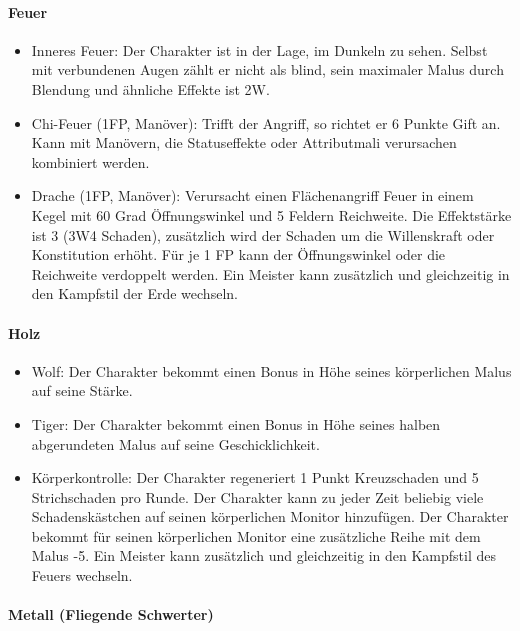 \documentclass{article}
\begin{document}
\paragraph{Feuer}

\begin{itemize}
\item Inneres Feuer: Der Charakter ist in der Lage, im Dunkeln zu sehen. Selbst mit verbundenen Augen zählt er nicht als blind, sein maximaler Malus durch Blendung und ähnliche Effekte ist 2W.
\item Chi-Feuer (1FP, Manöver): Trifft der Angriff, so richtet er 6 Punkte Gift an. Kann mit Manövern, die Statuseffekte oder Attributmali verursachen kombiniert werden.
\item Drache (1FP, Manöver): Verursacht einen Flächenangriff Feuer in einem Kegel mit 60 Grad Öffnungswinkel und 5 Feldern Reichweite. Die Effektstärke ist 3 (3W4 Schaden), zusätzlich wird der Schaden um die Willenskraft oder Konstitution erhöht. Für je 1 FP kann der Öffnungswinkel oder die Reichweite verdoppelt werden. Ein Meister kann zusätzlich und gleichzeitig in den Kampfstil der Erde wechseln.
\end{itemize}

\paragraph{Holz}

\begin{itemize}
\item Wolf: Der Charakter bekommt einen Bonus in Höhe seines körperlichen Malus auf seine Stärke.
\item Tiger: Der Charakter bekommt einen Bonus in Höhe seines halben abgerundeten Malus auf seine Geschicklichkeit.
\item Körperkontrolle: Der Charakter regeneriert 1 Punkt Kreuzschaden und 5 Strichschaden pro Runde. Der Charakter kann zu jeder Zeit beliebig viele Schadenskästchen auf seinen körperlichen Monitor hinzufügen. Der Charakter bekommt für seinen körperlichen Monitor eine zusätzliche Reihe mit dem Malus -5. Ein Meister kann zusätzlich und gleichzeitig in den Kampfstil des Feuers wechseln.
\end{itemize}

\paragraph{Metall (Fliegende Schwerter)}
\end{document}
